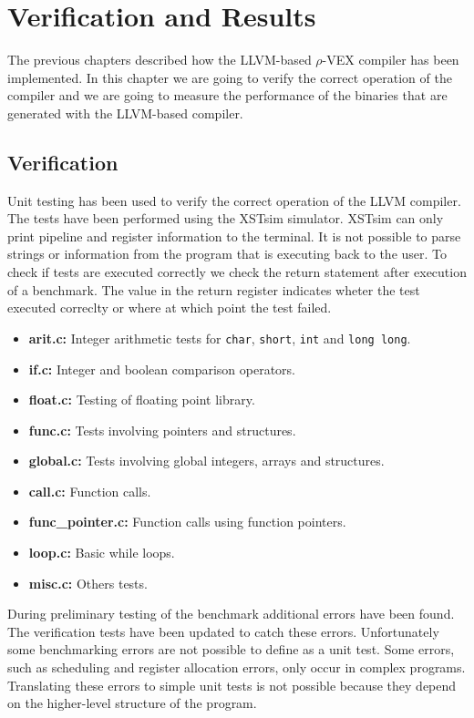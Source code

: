 \chapter{Verification and Results}
\label{chap:results}
The previous chapters described how the LLVM-based $\rho$-VEX compiler has been implemented. In this chapter we are going to verify the correct operation of the compiler and we are going to measure the performance of the binaries that are generated with the LLVM-based compiler. 

\section{Verification}
Unit testing has been used to verify the correct operation of the LLVM compiler. The tests have been performed using the XSTsim simulator. XSTsim can only print pipeline and register information to the terminal. It is not possible to parse strings or information from the program that is executing back to the user. To check if tests are executed correctly we check the return statement after execution of a benchmark. The value in the return register indicates wheter the test executed correclty or where at which point the test failed.

\begin{itemize}
	\item \textbf{arit.c:} Integer arithmetic tests for \texttt{char}, \texttt{short}, \texttt{int} and \texttt{long long}.
	\item \textbf{if.c:} Integer and boolean comparison operators.
	\item \textbf{float.c:} Testing of floating point library.
	\item \textbf{func.c:} Tests involving pointers and structures.
	\item \textbf{global.c:}  Tests involving global integers, arrays and structures.
	\item \textbf{call.c:} Function calls.
	\item \textbf{func\_pointer.c:} Function calls using function pointers.
	\item \textbf{loop.c:} Basic while loops.
	\item \textbf{misc.c:} Others tests.
\end{itemize}

During preliminary testing of the benchmark additional errors have been found. The verification tests have been updated to catch these errors. Unfortunately some benchmarking errors are not possible to define as a unit test. Some errors, such as scheduling and register allocation errors, only occur in complex programs. Translating these errors to simple unit tests is not possible because they depend on the higher-level structure of the program.

